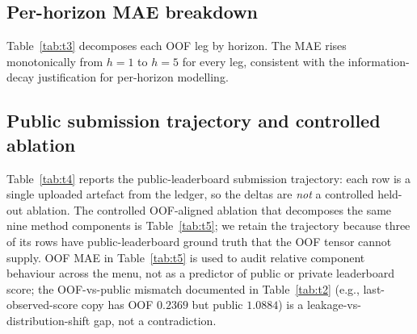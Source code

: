 \documentclass[conference,10pt,a4paper]{IEEEtran}
\begin{document}
\subsection{Per-horizon MAE breakdown}
Table~\ref{tab:t3} decomposes each OOF leg by horizon. The MAE rises monotonically from $h{=}1$ to $h{=}5$ for every leg, consistent with the information-decay justification for per-horizon modelling.

\begin{table}[t]
\centering
\caption{Per-horizon validation MAE for the 6 OOF legs, computed from \texttt{reports/oof\_tensor.csv} via \texttt{groupby("horizon").apply(MAE)}. ``All'' is the average across all 33{,}720 OOF rows.}
\label{tab:t3}
\end{table}

\subsection{Public submission trajectory and controlled ablation}
\label{sec:exp_ablation}
Table~\ref{tab:t4} reports the public-leaderboard submission trajectory: each row is a single uploaded artefact from the  ledger, so the deltas are \emph{not} a controlled held-out ablation. The controlled OOF-aligned ablation that decomposes the same nine method components is Table~\ref{tab:t5}; we retain the trajectory because three of its rows have public-leaderboard ground truth that the OOF tensor cannot supply. OOF MAE in Table~\ref{tab:t5} is used to audit relative component behaviour across the menu, not as a predictor of public or private leaderboard score; the OOF-vs-public mismatch documented in Table~\ref{tab:t2} (e.g., last-observed-score copy has OOF $0.2369$ but public $1.0884$) is a leakage-vs-distribution-shift gap, not a contradiction.
\end{document}
